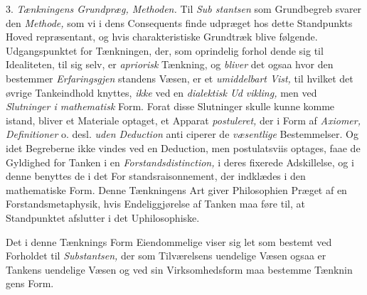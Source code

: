 3. \emph{Tænkningens Grundpræg, Methoden.} Til \emph{Sub\-%
stantsen} som Grundbegreb svarer den \emph{Methode,} som vi i
dens Consequents finde udpræget hos dette Standpunkts Hoved\-%
repræsentant, og hvis charakteristiske Grundtræk blive følgende.
Udgangspunktet for Tænkningen, der, som oprindelig forhol\-%
dende sig til Idealiteten, til sig selv, er \emph{apriorisk} Tænkning,
og \emph{bliver} det ogsaa hvor den bestemmer \emph{Erfaringsgjen}\-%
standens Væsen, er et \emph{umiddelbart Vist,} til hvilket det
øvrige Tankeindhold knyttes, \emph{ikke} ved en \emph{dialektisk Ud\-%
vikling,} men ved \emph{Slutninger i mathematisk} Form.
Forat disse Slutninger skulle kunne komme istand, bliver et
Materiale optaget, et Apparat \emph{postuleret,} der i Form af
\emph{Axiomer, Definitioner} o. desl. \emph{uden Deduction} anti\-%
ciperer de \emph{væsentlige} Bestemmelser. Og idet Begreberne
ikke vindes ved en Deduction, men postulatsviis optages, faae
de Gyldighed for Tanken i en \emph{Forstandsdistinction,} i
deres fixerede Adskillelse, og i denne benyttes de i det For\-%
standsraisonnement, der indklædes i den mathematiske Form.
Denne Tænkningens Art giver Philosophien Præget af en
Forstandsmetaphysik, hvis Endeliggjørelse af Tanken maa føre
til, at Standpunktet afslutter i det Uphilosophiske.

Det i denne Tænknings Form Eiendommelige viser sig
let som bestemt ved Forholdet til \emph{Substantsen,} der som
Tilværelsens uendelige Væsen ogsaa er Tankens uendelige
Væsen og ved sin Virksomhedsform maa bestemme Tænknin\-%
gens Form.

